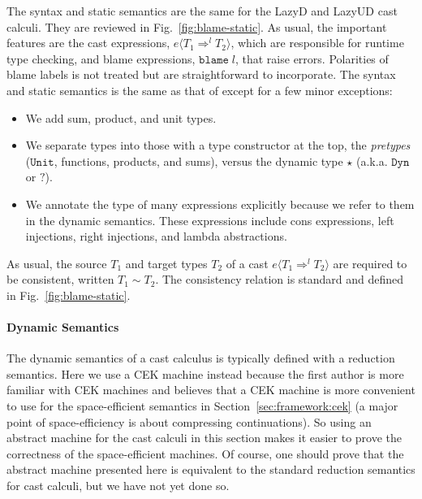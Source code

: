 \documentclass[acmsmall,review]{acmart}\settopmatter{printfolios=true,printccs=false,printacmref=false}
\newcommand{\figref}[1]{Fig.~\ref{#1}}
\newcommand{\lazyUD}{Lazy\;UD}
\newcommand{\lazyD}{Lazy\;D}
\newcommand{\POOunit}[0]{\mathtt{Unit}}
\newcommand{\eOOcast}[4]{#1 \langle \cOOcast{#2}{#3}{#4} \rangle}
\newcommand{\eOOblame}[1]{\mathtt{blame} \; #1}
\newcommand{\cOOcast}[3]{#1 \Rightarrow^{#2} #3}
\begin{document}
The syntax and static semantics are the same for the \lazyD{} and
\lazyUD{} cast calculi. They are reviewed in \figref{fig:blame-static}.
As usual, the important features are the cast expressions,
$\eOOcast{e}{T_1}{l}{T_2}$, which are responsible for runtime type
checking, and blame expressions, $\eOOblame{l}$, that raise errors. Polarities 
of blame labels is not treated but are straightforward to incorporate. 
The syntax and static semantics is the same as that of
\citet{siek2009exploring} except for a few minor exceptions:
\begin{itemize}
\item We add sum, product, and unit types.
\item We separate types into those with a type constructor at the top,
  the \emph{pretypes} ($\POOunit$, functions, products, and sums),
  versus the dynamic type $\star$ (a.k.a. $\mathtt{Dyn}$ or
  $\mathbb{?}$).
\item We annotate the type of many expressions explicitly because we 
refer to them in the dynamic semantics. These expressions include cons 
expressions, left injections, right injections, and lambda abstractions.
\end{itemize}
As usual, the source $T_1$ and target types $T_2$ of a cast
$\eOOcast{e}{T_1}{l}{T_2}$ are required to be consistent, written $T_1
\sim T_2$. The consistency relation is standard and defined in
\figref{fig:blame-static}.

\paragraph{Dynamic Semantics}

The dynamic semantics of a cast calculus is typically defined with a
reduction semantics. Here we use a CEK machine
\citep{felleisen1986control} instead because the first author is more
familiar with CEK machines and believes that a CEK machine is more
convenient to use for the space-efficient semantics in
Section~\ref{sec:framework:cek} (a major point of space-efficiency is about 
compressing continuations). So using an abstract machine for the cast calculi in
this section makes it easier to prove the correctness of the space-efficient
machines. Of course, one should prove that the abstract machine
presented here is equivalent to the standard reduction semantics for
cast calculi, but we have not yet done so.
\end{document}
